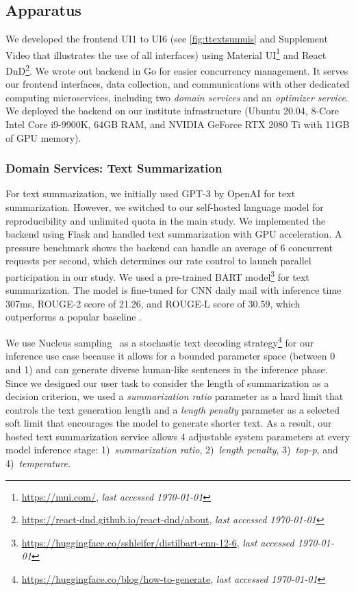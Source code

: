 \documentclass[acmsmall,screen,nonacm]{acmart}
\begin{document}
\subsection{Apparatus}
We developed the frontend UI1 to UI6 (see \autoref{fig:ttextsumuis} and Supplement Video that illustrates the use of all interfaces) using Material UI\footnote{\url{https://mui.com/}, \emph{last accessed \today}} and React DnD\footnote{\url{https://react-dnd.github.io/react-dnd/about}, \emph{last accessed \today}}.
%
We wrote out backend in Go %
for easier concurrency management. It serves our frontend interfaces, data collection, and communications with other dedicated computing microservices, including two \emph{domain services} and an \emph{optimizer service}. We deployed the backend on our institute infrastructure (Ubuntu 20.04, 8-Core Intel Core i9-9900K, 64GB RAM, and NVIDIA GeForce RTX 2080 Ti with 11GB of GPU memory).

\subsubsection{Domain Services: Text Summarization} For text summarization, we initially used GPT-3 by OpenAI for text summarization. However, we switched to our self-hosted language model for reproducibility and unlimited quota in the main study. We implemented the backend using Flask and handled text summarization with GPU acceleration. A pressure benchmark shows the backend can handle an average of 6 concurrent requests per second, which determines our rate control to launch parallel participation in our study. We used a pre-trained BART model\footnote{\url{https://huggingface.co/sshleifer/distilbart-cnn-12-6}, \emph{last accessed \today}} for text summarization. The model is fine-tuned for CNN daily mail with inference time 307ms, ROUGE-2 score of 21.26, and ROUGE-L score of 30.59, which outperforms a popular baseline \cite{lewis2019bart}.

We use Nucleus sampling~\cite{holtzman2020topp} as a stochastic text decoding strategy\footnote{\url{https://huggingface.co/blog/how-to-generate}, \emph{last accessed \today}} for our inference use case because it allows for a bounded parameter space (between 0 and 1) and can generate diverse human-like sentences in the inference phase. Since we designed our user task to consider the length of summarization as a decision criterion, we used a \emph{summarization ratio} parameter as a hard limit that controls the text generation length and a \emph{length penalty} parameter as a selected soft limit that encourages the model to generate shorter text. As a result, our hosted text summarization service allows 4 adjustable system parameters at every model inference stage:
1)~\emph{summarization ratio},
2)~\emph{length penalty},
3)~\emph{top-p}, and
4)~\emph{temperature}.
\end{document}
